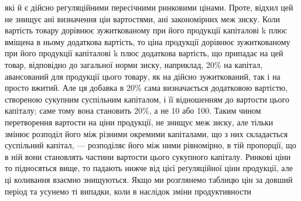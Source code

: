 які й є дійсно регуляційними пересічними ринковими цінами. Проте, відхил цей
не знищує ані визначення цін вартостями, ані закономірних меж зиску. Коли
вартість товару дорівнює зужиткованому при його продукції капіталові k плюс
вміщена в ньому додаткова вартість, то ціна продукції дорівнює зужиткованому
при його продукції капіталові k плюс додаткова вартість, що припадає на цей
товар, відповідно до загальної норми зиску, наприклад, 20\% на капітал, авансований
для продукції цього товару, як на дійсно зужиткований, так і на просто
вжитий. Але ця добавка в 20\% сама визначається додатковою вартістю, створеною
сукупним суспільним капіталом, і її відношенням до вартости цього капіталу;
саме тому вона становить 20\%, а не 10 або 100. Таким чином перетворення
вартости на ціни продукції, не знищує меж зиску, але тільки змінює
розподіл його між різними окремими капіталами, що з них складається суспільний
капітал, — розподіляє його між ними рівномірно, в тій пропорції, що в ній
вони становлять частини вартости цього сукупного капіталу. Ринкові ціни
то підносяться вище, то падають нижче від цієї реґуляційної ціни продукції,
але ці коливання взаємно знищуються. Якщо ми розглянемо таблицю цін за
довший період та усунемо ті випадки, коли в наслідок зміни продуктивности
